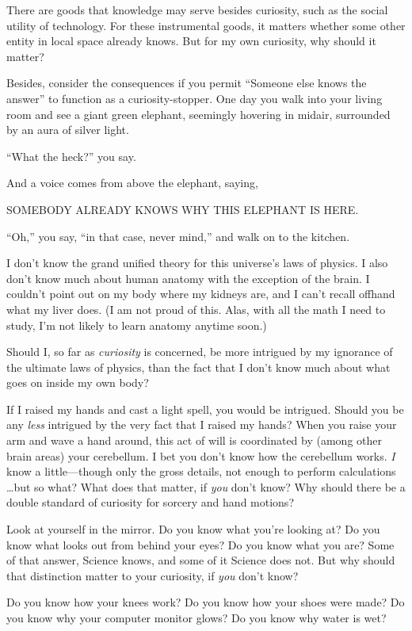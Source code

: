 {
 There are goods that knowledge may serve besides curiosity, such
as the social utility of technology. For these instrumental goods, it
matters whether some other entity in local space already knows. But for
my own curiosity, why should it matter?}

{
 Besides, consider the consequences if you permit
``Someone else knows the answer'' to
function as a curiosity-stopper. One day you walk into your living room
and see a giant green elephant, seemingly hovering in midair,
surrounded by an aura of silver light.}

{
 ``What the heck?'' you say.}

{
 And a voice comes from above the elephant, saying,}

{
 SOMEBODY ALREADY KNOWS WHY THIS ELEPHANT IS HERE.}

{
 ``Oh,'' you say,
``in that case, never mind,'' and
walk on to the kitchen.}

{
 I don't know the grand unified theory for this
universe's laws of physics. I also
don't know much about human anatomy with the exception
of the brain. I couldn't point out on my body where my
kidneys are, and I can't recall offhand what my liver
does. (I am not proud of this. Alas, with all the math I need to study,
I'm not likely to learn anatomy anytime soon.)}

{
 Should I, so far as \textit{curiosity} is concerned, be more
intrigued by my ignorance of the ultimate laws of physics, than the
fact that I don't know much about what goes on inside
my own body?}

{
 If I raised my hands and cast a light spell, you would be
intrigued. Should you be any \textit{less} intrigued by the very fact
that I raised my hands? When you raise your arm and wave a hand around,
this act of will is coordinated by (among other brain areas) your
cerebellum. I bet you don't know how the cerebellum
works. \textit{I} know a little---though only the gross details, not
enough to perform calculations \ldots but so what? What does that
matter, if \textit{you} don't know? Why should there be
a double standard of curiosity for sorcery and hand motions?}

{
 Look at yourself in the mirror. Do you know what
you're looking at? Do you know what looks out from
behind your eyes? Do you know what you are? Some of that answer,
Science knows, and some of it Science does not. But why should that
distinction matter to your curiosity, if \textit{you}
don't know?}

{
 Do you know how your knees work? Do you know how your shoes were
made? Do you know why your computer monitor glows? Do you know why
water is wet?}

